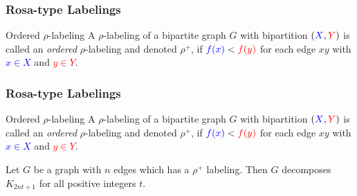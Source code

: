 \documentclass[11pt,serif,professionalfont,aspectratio=169]{beamer}
\newcommand{\vertex}{\node[vertex]}
\theoremstyle{plain}
\begin{document}
\begin{frame}
\frametitle{Rosa-type Labelings}
\begin{block}{Ordered $\rho$-labeling}
A $\rho$-labeling of a bipartite graph $G$ with bipartition $(\textcolor{blue}{X},\textcolor{red}{Y})$ is called an \emph{ordered} $\rho$-labeling and denoted $\rho^+$, if $\textcolor{blue}{f(x)}<\textcolor{red}{f(y)}$ for each edge $xy$ with \textcolor{blue}{$x\in X$} and \textcolor{red}{$y \in Y$}.
\end{block}
\begin{center}
\end{center}
\end{frame}
\begin{frame}
\frametitle{Rosa-type Labelings}
\begin{block}{Ordered $\rho$-labeling}
A $\rho$-labeling of a bipartite graph $G$ with bipartition $(\textcolor{blue}{X},\textcolor{red}{Y})$ is called an \emph{ordered} $\rho$-labeling and denoted $\rho^+$, if $\textcolor{blue}{f(x)}<\textcolor{red}{f(y)}$ for each edge $xy$ with \textcolor{blue}{$x\in X$} and \textcolor{red}{$y \in Y$}.
\end{block}
\begin{theorem}
Let $G$ be a graph with $n$ edges which has a $\rho^+$ labeling. Then $G$ decomposes $K_{2nt+1}$ for all positive integers $t.$
\end{theorem}
\pause
\begin{center}
\end{center}
\end{frame}
\end{document}
